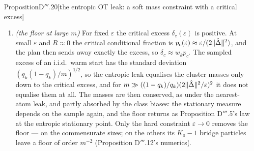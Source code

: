 \begin{thm}{Proposition}{D$'''$.20}[the entropic OT leak: a soft mass constraint with a critical excess]
\begin{enumerate}[label=\textup{(\roman*)}]
    $\varepsilon < 2\sigma_0p(1 - p)\hat\Delta^\T A_k^{-1}\hat\Delta$. Below $\varepsilon_c$ the over-weighted
    collapsed class is a saddle and splits; its split-off particles leave toward an atom its conditional plan
    charges, which need not be an under-weighted one, so a split moves the excess but need not reduce it. Above
    $\varepsilon_c$ the class's separation block is positive, and the replicated configuration is a local minimum
    when the collective block and the other classes' blocks are positive as well; the excess is then absorbed by a
    bias of the class atom toward $T_k$.
  \item \emph{(the floor at large $m$)} For fixed $\varepsilon$ the critical excess $\delta_c(\varepsilon)$ is
    positive. At small $\varepsilon$ and $R\approx0$ the critical conditional fraction is
    $p_c(\varepsilon)\approx\varepsilon/(2\lVert \hat\Delta\rVert^2)$, and the plan then sends away exactly the excess, so
    $\delta_c\approx w_kp_c$. The sampled excess of an i.i.d.\ warm start has the standard deviation
    $(q_k(1 - q_k)/m)^{1/2}$, so the entropic leak equalises the cluster masses only down to the critical excess, and
    for $m\gg((1 - q_k)/q_k)(2\lVert \hat\Delta\rVert^2/\varepsilon)^2$ it does not equalise them at all. The masses are
    then conserved, as under the nearest-atom leak, and partly absorbed by the class biases: the stationary measure
    depends on the sample again, and the floor returns as Proposition D$'''$.5's law at the entropic stationary
    point. Only the hard constraint $\varepsilon\to0$ removes the floor --- on the commensurate sizes; on the others
    its $K_0 - 1$ bridge particles leave a floor of order $m^{-2}$ (Proposition D$'''$.12's numerics).
\end{enumerate}
\end{thm}
